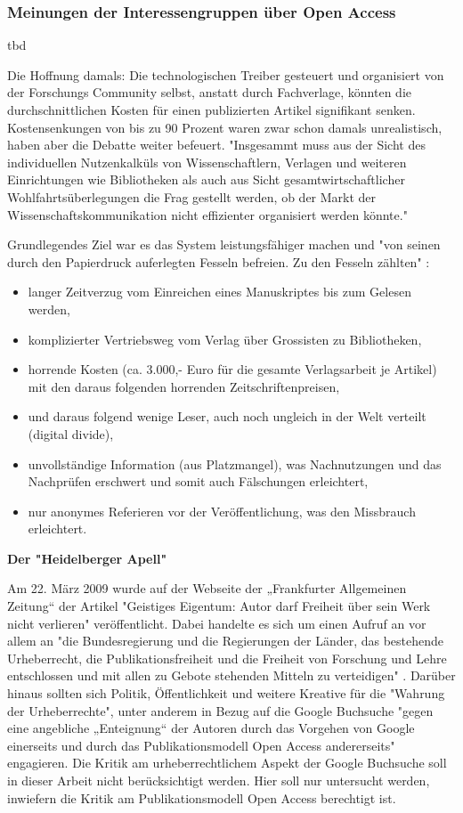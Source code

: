 \subsubsection{Meinungen der Interessengruppen über Open Access}
tbd

Die Hoffnung damals: Die technologischen Treiber gesteuert und organisiert von der Forschungs Community selbst, anstatt durch Fachverlage, könnten die durchschnittlichen Kosten für einen publizierten Artikel signifikant senken. Kostensenkungen von bis zu 90 Prozent\cite{hilf_2004} waren zwar schon damals unrealistisch, haben aber die Debatte weiter befeuert. "Insgesammt muss aus der Sicht des individuellen Nutzenkalküls von Wissenschaftlern, Verlagen und weiteren Einrichtungen wie Bibliotheken als auch aus Sicht gesamtwirtschaftlicher Wohlfahrtsüberlegungen die Frag gestellt werden, ob der Markt der Wissenschaftskommunikation nicht effizienter organisiert werden könnte."\cite{Hess_2006}

Grundlegendes Ziel war es das System leistungsfähiger machen und "von seinen durch den Papierdruck auferlegten Fesseln befreien. Zu den Fesseln zählten" \cite{hilf_2004}:
\begin{itemize}
\item langer Zeitverzug vom Einreichen eines Manuskriptes bis zum Gelesen werden,
\item komplizierter Vertriebsweg vom Verlag über Grossisten zu Bibliotheken,
\item horrende Kosten (ca. 3.000,- Euro für die gesamte Verlagsarbeit je Artikel) mit den daraus folgenden horrenden Zeitschriftenpreisen,
\item und daraus folgend wenige Leser, auch noch ungleich in der Welt verteilt (digital divide),
\item unvollständige Information (aus Platzmangel), was Nachnutzungen und das Nachprüfen erschwert und somit auch Fälschungen erleichtert,
\item nur anonymes Referieren vor der Veröffentlichung, was den Missbrauch erleichtert. 
\end{itemize}

\textbf{Der "Heidelberger Apell"}

Am 22. März 2009 wurde auf der Webseite der „Frankfurter Allgemeinen Zeitung“ der Artikel "Geistiges Eigentum: Autor darf Freiheit über sein Werk nicht verlieren" \cite{faz_heidelberger_apell_2009} veröffentlicht. Dabei handelte es sich um einen Aufruf an vor allem an "die Bundesregierung und die Regierungen der Länder, das bestehende Urheberrecht, die Publikationsfreiheit und die Freiheit von Forschung und Lehre entschlossen und mit allen zu Gebote stehenden Mitteln zu verteidigen" \cite{ITK_2009}. Darüber hinaus sollten sich Politik, Öffentlichkeit und weitere Kreative für die "Wahrung der Urheberrechte", unter anderem in Bezug auf die Google Buchsuche "gegen eine angebliche „Enteignung“ der Autoren durch das Vorgehen von Google einerseits und durch das Publikationsmodell Open Access andererseits" \cite{WD_bundestag_2009} engagieren. Die Kritik am urheberrechtlichem Aspekt der Google Buchsuche soll in dieser Arbeit nicht berücksichtigt werden. Hier soll nur untersucht werden, inwiefern die Kritik am Publikationsmodell Open Access berechtigt ist.

